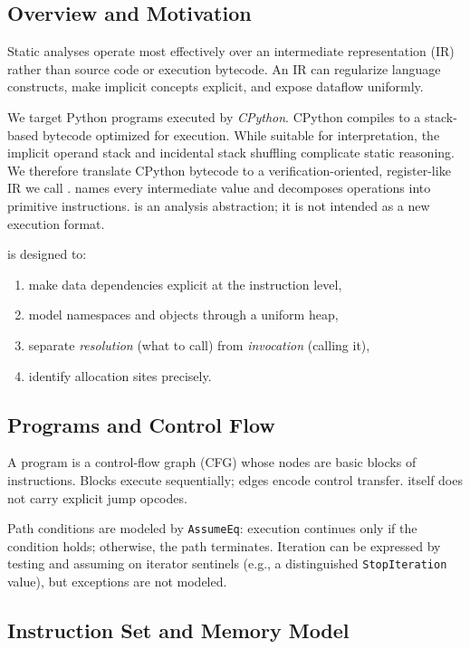 \subsection{Overview and Motivation}

Static analyses operate most effectively over an intermediate representation (IR) rather than source code or execution bytecode. An IR can regularize language constructs, make implicit concepts explicit, and expose dataflow uniformly.

We target Python programs executed by \emph{CPython}. CPython compiles to a stack-based bytecode optimized for execution. While suitable for interpretation, the implicit operand stack and incidental stack shuffling complicate static reasoning. We therefore translate CPython bytecode to a verification-oriented, register-like IR we call \spytecode. \spytecode names every intermediate value and decomposes operations into primitive instructions. \spytecode is an analysis abstraction; it is not intended as a new execution format.

\spytecode is designed to:
\begin{enumerate}
\item make data dependencies explicit at the instruction level,
\item model namespaces and objects through a uniform heap,
\item separate \emph{resolution} (what to call) from \emph{invocation} (calling it),
\item identify allocation sites precisely.
\end{enumerate}

\subsection{Programs and Control Flow}

A \spytecode program is a control-flow graph (CFG) whose nodes are basic blocks of \spytecode instructions. Blocks execute sequentially; edges encode control transfer. \spytecode itself does not carry explicit jump opcodes.

Path conditions are modeled by \texttt{AssumeEq}: execution continues only if the condition holds; otherwise, the path terminates. Iteration can be expressed by testing and assuming on iterator sentinels (e.g., a distinguished \texttt{StopIteration} value), but exceptions are not modeled.

\subsection{Instruction Set and Memory Model}

